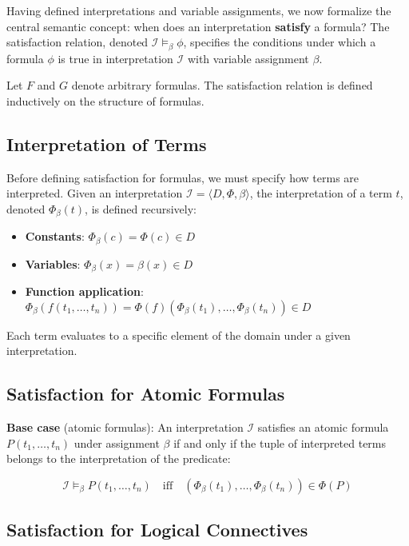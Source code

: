 \documentclass[11pt,a4paper]{article}
\theoremstyle{definition}
\theoremstyle{plain}
\theoremstyle{remark}
\begin{document}
Having defined interpretations and variable assignments, we now formalize the central semantic concept: when does an interpretation \textbf{satisfy} a formula? The satisfaction relation, denoted $\mathcal{I} \models_\beta \phi$, specifies the conditions under which a formula $\phi$ is true in interpretation $\mathcal{I}$ with variable assignment $\beta$.

Let $F$ and $G$ denote arbitrary formulas. The satisfaction relation is defined inductively on the structure of formulas.

\subsection{Interpretation of Terms}

Before defining satisfaction for formulas, we must specify how terms are interpreted. Given an interpretation $\mathcal{I} = \langle D, \Phi, \beta \rangle$, the interpretation of a term $t$, denoted $\Phi_\beta(t)$, is defined recursively:

\begin{itemize}
    \item \textbf{Constants}: $\Phi_\beta(c) = \Phi(c) \in D$
    \item \textbf{Variables}: $\Phi_\beta(x) = \beta(x) \in D$
    \item \textbf{Function application}: $\Phi_\beta(f(t_1, \dots, t_n)) = \Phi(f)(\Phi_\beta(t_1), \dots, \Phi_\beta(t_n)) \in D$
\end{itemize}

Each term evaluates to a specific element of the domain under a given interpretation.

\subsection{Satisfaction for Atomic Formulas}

\textbf{Base case} (atomic formulas): An interpretation $\mathcal{I}$ satisfies an atomic formula $P(t_1, \dots, t_n)$ under assignment $\beta$ if and only if the tuple of interpreted terms belongs to the interpretation of the predicate:

\[
\mathcal{I} \models_\beta P(t_1, \dots, t_n) \quad \text{iff} \quad (\Phi_\beta(t_1), \dots, \Phi_\beta(t_n)) \in \Phi(P)
\]

\subsection{Satisfaction for Logical Connectives}
\end{document}
